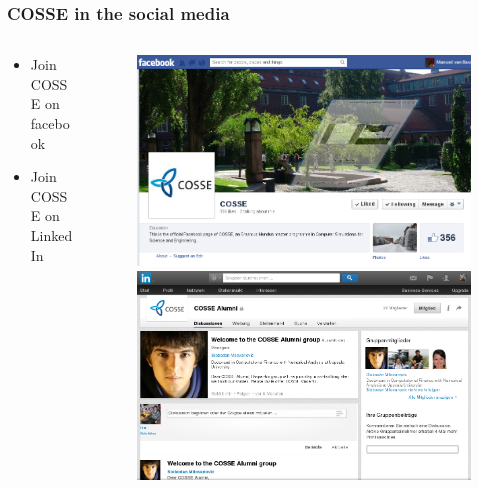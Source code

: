 \documentclass{beamer}
\begin{document}
\begin{frame}
\frametitle{COSSE in the social media}
\begin{columns}
\begin{column}{0.55\textwidth}
\begin{itemize}
 \item Join COSSE on facebook
 \item Join COSSE on LinkedIn
\end{itemize}
\end{column}
\begin{column}{0.45\textwidth}
\begin{figure}
\centering
\includegraphics[width=\textwidth]{images/fb.png}\\
\vspace{0.3cm}
\includegraphics[width=\textwidth]{images/LinkedIn.png}
\end{figure}
\end{column}
\end{columns}

\end{frame}
\end{document}
